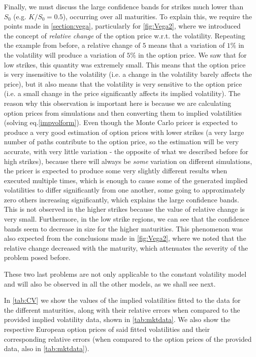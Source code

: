 Finally, we must discuss the large confidence bands for strikes much lower than $S_0$ (e.g. $K/S_0=0.5$), occurring over all maturities. To explain this, we require the points made in \autoref{section:vega}, particularly for \autoref{fig:Vega2}, where we introduced the concept of \emph{relative change} of the option price w.r.t. the volatility. Repeating the example from before, a relative change of $5$ means that a variation of $1\%$ in the volatility will produce a variation of $5\%$ in the option price. We saw that for low strikes, this quantity was extremely small. This means that the option price is very insensitive to the volatility (i.e. a change in the volatility barely affects the price), but it also means that the volatility is very sensitive to the option price (i.e. a small change in the price significantly affects its implied volatility). The reason why this observation is important here is because we are calculating option prices from simulations and then converting them to implied volatilities (solving eq.\eqref{impvolform}).
Even though the Monte Carlo pricer is expected to produce a very good estimation of option prices with lower strikes (a very large number of paths contribute to the option price, so the estimation will be very accurate, with very little variation - the opposite of what we described before for high strikes), because there will always be \emph{some} variation on different simulations, the pricer is expected to produce some very slightly different results when executed multiple times, which is enough to cause some of the generated implied volatilities to differ significantly from one another, some going to approximately zero others increasing significantly, which explains the large confidence bands. This is not observed in the higher strikes because the value of relative change is very small. Furthermore, in the low strike regions, we can see that the confidence bands seem to decrease in size for the higher maturities. This phenomenon was also expected from the conclusions made in \autoref{fig:Vega2}, where we noted that the relative change decreased with the maturity, which attenuates the severity of the problem posed before.

These two last problems are not only applicable to the constant volatility model and will also be observed in all the other models, as we shall see next.

\vfill
\newpage

In \autoref{tab:CV} we show the values of the implied volatilities fitted to the data for the different maturities, along with their relative errors when compared to the provided implied volatility data, shown in \autoref{tab:mktdata}. We also show the respective European option prices of said fitted volatilities and their corresponding relative errors (when compared to the option prices of the provided data, also in \autoref{tab:mktdata}).



